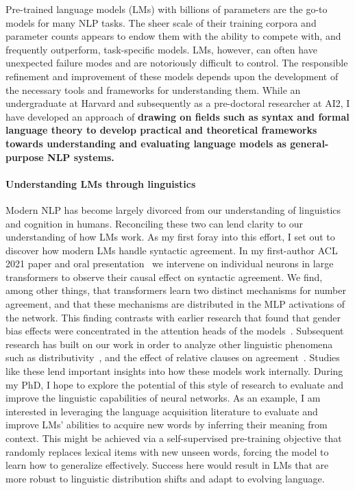\documentclass[11pt]{article}
\begin{document}
Pre-trained language models (LMs) with billions of parameters 
are the go-to models for many NLP tasks.
The sheer scale of their training corpora and parameter counts
appears to endow them with the ability to compete with, 
and frequently outperform, task-specific models.
LMs, however, can often have unexpected failure modes 
and are notoriously difficult to control.
The responsible refinement and improvement of these models
depends upon the development of the necessary tools 
and frameworks for understanding them.
While an undergraduate at Harvard and subsequently as a pre-doctoral researcher 
at AI2, I have developed an approach of \textbf{
  drawing on fields such as syntax and formal language theory 
  to develop practical and theoretical frameworks  
  towards understanding and evaluating language models 
  as general-purpose NLP systems.
}

\paragraph{Understanding LMs through linguistics}

Modern NLP has become largely divorced 
from our understanding of linguistics and cognition in humans.
Reconciling these two can lend clarity to our understanding of how LMs work.
As my first foray into this effort, I set out to 
discover how modern LMs handle syntactic agreement.
In my first-author ACL 2021 paper and oral presentation~\cite{Finlayson2021CausalAO}
we intervene on individual neurons in large transformers 
to observe their causal effect on syntactic agreement.
We find, among other things, that transformers learn 
two distinct mechanisms for number agreement,
and that these mechanisms are distributed in the MLP activations of the network.
This finding contrasts with earlier research that found that 
gender bias effects were concentrated in the attention heads of the models~\cite{Vig2020InvestigatingGB}.
Subsequent research has built on our work 
in order to analyze other linguistic phenomena 
such as distributivity~\cite{Ban2022TestingPL},
and the effect of relative clauses on agreement~\cite{Ravfogel2021CounterfactualIR}.
Studies like these lend important insights into how these models work internally.
During my PhD, I hope to explore the potential of this style of research 
to evaluate and improve the linguistic capabilities of neural networks. 
As an example, I am interested in leveraging the language acquisition literature
to evaluate and improve LMs' abilities 
to acquire new words by inferring their meaning from context.
This might be achieved via a self-supervised pre-training objective 
that randomly replaces lexical items with new unseen words, 
forcing the model to learn how to generalize effectively.
Success here would result in LMs that are 
more robust to linguistic distribution shifts
and adapt to evolving language.
\end{document}
